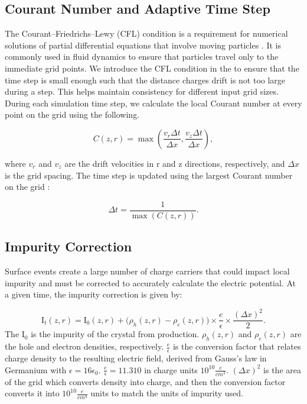 \subsection{Courant Number and Adaptive Time Step}

The Courant–Friedrichs–Lewy (CFL) condition is a requirement for numerical solutions of partial differential equations that involve moving particles \cite{cfl_condition}. It is commonly used in fluid dynamics to ensure that particles travel only to the immediate grid points. We introduce the CFL condition in the {\ehd} to ensure that the time step is small enough such that the distance charges drift is not too large during a step. This helps maintain consistency for different input grid sizes. During each simulation time step, we calculate the local Courant number at every point on the grid using the following.

\begin{equation}
C(z,r) = \max \left( \frac{v_r \Delta t}{\Delta x}, \frac{v_z \Delta t}{\Delta x} \right),
\end{equation}

where \( v_r \) and \( v_z \) are the drift velocities in r and z directions, respectively, and  \( \Delta x \) is the grid spacing. The time step is updated using the largest Courant number on the grid :

\begin{equation}
\Delta t = \frac{1}{\max (C(z,r))}.
\end{equation}



\subsection{Impurity Correction}
Surface events create a large number of charge carriers that could impact local impurity and must be corrected to accurately calculate the electric potential. At a given time, the impurity correction is given by:

\begin{equation}
  {\text{I}_{t}}(z, r) = \text{I}_{0}(z, r) +
  \bigl( \rho_h(z, r) - \rho_e(z, r) \bigr) \times \frac{e}{\epsilon} \times \frac{(\Delta x)^2}{2}.
\end{equation}
The $\text{I}_{0}$ is the impurity of the crystal from production. $\rho_h(z,r)$ and $\rho_e(z,r)$ are the hole and electron densities, respectively. $\frac{e}{\epsilon}$ is the conversion factor that relates charge density to the resulting electric field, derived from Gauss’s law in Germanium with $\epsilon = 16\epsilon_0$. $\frac{e}{\epsilon} = 11.310$ in 
charge units $10^{10}\frac{e}{cm^3}$. $(\Delta x)^2$ is the area of the grid which converts density into charge, and then the conversion factor converts it into $10^{10}\frac{e}{cm^3}$ units to match the units of impurity used.

